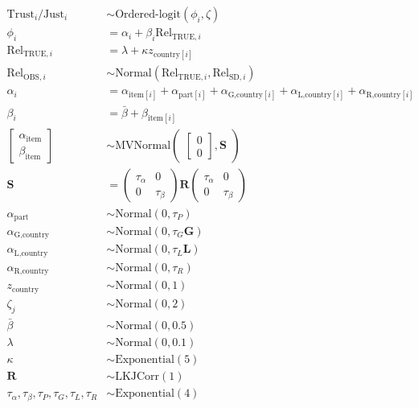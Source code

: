 \documentclass[
  man,floatsintext]{apa6}
\begin{document}
\[
\begin{aligned}
\text{Trust}_{i}/\text{Just}_{i} &\sim \text{Ordered-logit}(\phi_{i},\zeta) \\
\phi_{i} &= \alpha_{i} + \beta_{i}\text{Rel}_{\text{TRUE},i} \\
\text{Rel}_{\text{TRUE},i} &= \lambda + \kappa z_{\text{country}[i]} \\
\text{Rel}_{\text{OBS},i} &\sim \text{Normal}(\text{Rel}_{\text{TRUE},i}, \text{Rel}_{\text{SD},i}) \\
\alpha_{i} &= \alpha_{\text{item}[i]} + \alpha_{\text{part}[i]} + \alpha_{\text{G,country}[i]} + \alpha_{\text{L,country}[i]} + \alpha_{\text{R,country}[i]} \\
\beta_{i} &= \bar{\beta} + \beta_{\text{item}[i]} \\
\begin{bmatrix}\alpha_{\text{item}}\\
\beta_{\text{item}}\end{bmatrix} &\sim \text{MVNormal}
\begin{pmatrix}\begin{bmatrix}0\\0\end{bmatrix}, \textbf{S}
\end{pmatrix}\\
\textbf{S} &=
\begin{pmatrix}\tau_{\alpha}&0\\0&\tau_{\beta}\end{pmatrix}
\textbf{R}
\begin{pmatrix}\tau_{\alpha}&0\\0&\tau_{\beta}\end{pmatrix} \\
\alpha_{\text{part}} &\sim \text{Normal}(0, \tau_{P}) \\
\alpha_{\text{G,country}} &\sim \text{Normal}(0, \tau_{G} \textbf{G}) \\
\alpha_{\text{L,country}} &\sim \text{Normal}(0, \tau_{L} \textbf{L}) \\
\alpha_{\text{R,country}} &\sim \text{Normal}(0, \tau_{R}) \\
z_{\text{country}} &\sim \text{Normal}(0, 1)\\
\zeta_{j} &\sim \text{Normal}(0, 2)\\
\bar{\beta} &\sim \text{Normal}(0, 0.5) \\
\lambda &\sim \text{Normal}(0, 0.1) \\
\kappa &\sim \text{Exponential}(5) \\
\textbf{R} &\sim \text{LKJCorr}(1)\\
\tau_{\alpha},\tau_{\beta},\tau_{P},\tau_{G},\tau_{L},\tau_{R} &\sim \text{Exponential}(4) \\
\end{aligned}
\]
\end{document}

